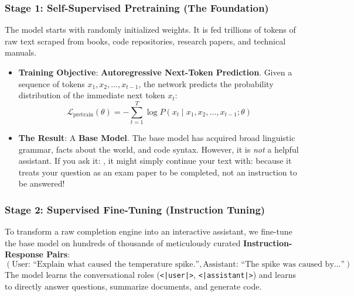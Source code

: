 \subsubsection{Stage 1: Self-Supervised Pretraining (The Foundation)}
The model starts with randomly initialized weights. It is fed trillions of tokens of raw text scraped from books, code repositories, research papers, and technical manuals.
\begin{itemize}
    \item \textbf{Training Objective}: \textbf{Autoregressive Next-Token Prediction}. Given a sequence of tokens $x_1, x_2, \dots, x_{t-1}$, the network predicts the probability distribution of the immediate next token $x_t$:
    \begin{equation}
    \mathcal{L}_{\text{pretrain}}(\theta) = -\sum_{t=1}^T \log P(x_t \mid x_1, x_2, \dots, x_{t-1}; \theta)\label{eq:pretrain_loss}
    \end{equation}
    \item \textbf{The Result}: A \textbf{Base Model}. The base model has acquired broad linguistic grammar, facts about the world, and code syntax. However, it is \emph{not} a helpful assistant. If you ask it: , it might simply continue your text with:  because it treats your question as an exam paper to be completed, not an instruction to be answered!
\end{itemize}

\subsubsection{Stage 2: Supervised Fine-Tuning (Instruction Tuning)}
To transform a raw completion engine into an interactive assistant, we fine-tune the base model on hundreds of thousands of meticulously curated \textbf{Instruction-Response Pairs}:
\begin{equation*}
\left( \text{User: ``Explain what caused the temperature spike.''}, \text{Assistant: ``The spike was caused by...''} \right)
\end{equation*}
The model learns the conversational roles (\texttt{<|user|>}, \texttt{<|assistant|>}) and learns to directly answer questions, summarize documents, and generate code.

